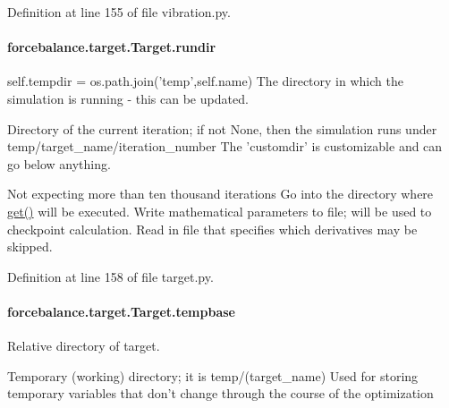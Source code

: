 Definition at line 155 of file vibration.\-py.

\hypertarget{classforcebalance_1_1target_1_1Target_a6872de5b2d4273b82336ea5b0da29c9e}{
\paragraph[{rundir}]{\setlength{\rightskip}{0pt plus 5cm}forcebalance.\-target.\-Target.\-rundir\hspace{0.3cm}{\ttfamily [inherited]}}}\label{classforcebalance_1_1target_1_1Target_a6872de5b2d4273b82336ea5b0da29c9e}


self.\-tempdir = os.\-path.\-join('temp',self.\-name) The directory in which the simulation is running -\/ this can be updated. 

Directory of the current iteration; if not None, then the simulation runs under temp/target\-\_\-name/iteration\-\_\-number The 'customdir' is customizable and can go below anything.

Not expecting more than ten thousand iterations Go into the directory where \hyperlink{classforcebalance_1_1target_1_1Target_a1389888302c49d529716cb45b13a6f5a}{get()} will be executed. Write mathematical parameters to file; will be used to checkpoint calculation. Read in file that specifies which derivatives may be skipped. 

Definition at line 158 of file target.\-py.

\hypertarget{classforcebalance_1_1target_1_1Target_ae5b544d3e11365865813ef3d626ef81d}{
\paragraph[{tempbase}]{\setlength{\rightskip}{0pt plus 5cm}forcebalance.\-target.\-Target.\-tempbase\hspace{0.3cm}{\ttfamily [inherited]}}}\label{classforcebalance_1_1target_1_1Target_ae5b544d3e11365865813ef3d626ef81d}


Relative directory of target. 

Temporary (working) directory; it is temp/(target\-\_\-name) Used for storing temporary variables that don't change through the course of the optimization 

